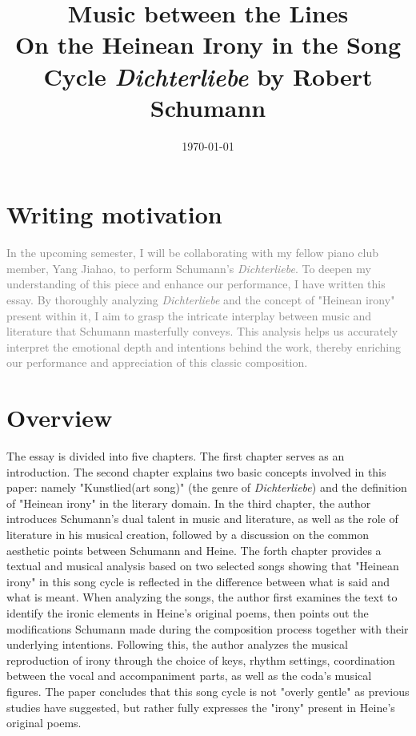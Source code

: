 \documentclass[10pt,a4paper,twocolumn]{rho}
\title{Music between the Lines\\On the Heinean Irony in the Song Cycle \textit{Dichterliebe} by Robert Schumann}
\author{\centering{Henry Lin(Fangheng Lin), \textit{Computer Science and Financial Engineering, Nanjing University}}}
\affil{231275040@smail.nju.edu.cn}
\date{\today}
\begin{document}
	
    

    \maketitle
    \small{\tableofcontents}
    \thispagestyle{firststyle}
    


\section*{Writing motivation}
\textcolor{gray}{
 In the upcoming semester, I will be collaborating with my fellow piano club member, Yang Jiahao, to perform Schumann's \textit{Dichterliebe}. To deepen my understanding of this piece and enhance our performance, I have written this essay. By thoroughly analyzing \textit{Dichterliebe} and the concept of "Heinean irony" present within it, I aim to grasp the intricate interplay between music and literature that Schumann masterfully conveys. This analysis helps us accurately interpret the emotional depth and intentions behind the work, thereby enriching our performance and appreciation of this classic composition.}


\newpage
\section*{Overview}
 The essay is divided into five chapters. The first chapter serves as an introduction. The second chapter explains two basic concepts involved in this paper: namely "Kunstlied(art song)" (the genre of \textit{Dichterliebe}) and the definition of "Heinean irony" in the literary domain. In the third chapter, the author introduces Schumann's dual talent in music and literature, as well as the role of literature in his musical creation, followed by a discussion on the common aesthetic points between Schumann and Heine. The forth chapter provides a textual and musical analysis based on two selected songs showing that "Heinean irony" in this song cycle is reflected in the difference between what is said and what is meant. When analyzing the songs, the author first examines the text to identify the ironic elements in Heine's original poems, then points out the modifications Schumann made during the composition process together with their underlying intentions. Following this, the author analyzes the musical reproduction of irony through the choice of keys, rhythm settings, coordination between the vocal and accompaniment parts, as well as the coda's musical figures. The paper concludes that this song cycle is not "overly gentle" as previous studies have suggested, but rather fully expresses the "irony" present in Heine's original poems.
\end{document}
